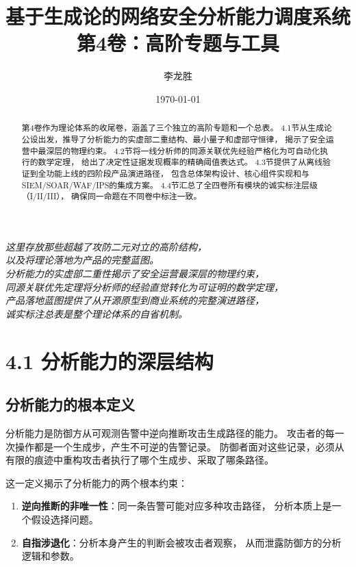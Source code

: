 \documentclass[11pt,a4paper]{article}
\title{基于生成论的网络安全分析能力调度系统\\
第4卷：高阶专题与工具}
\author{李龙胜}
\date{\today}
\begin{document}
\maketitle

\begin{center}
\textit{
这里存放那些超越了攻防二元对立的高阶结构，\\
以及将理论落地为产品的完整蓝图。\\
分析能力的实虚部二重性揭示了安全运营最深层的物理约束，\\
同源关联优先定理将分析师的经验直觉转化为可证明的数学定理，\\
产品落地蓝图提供了从开源原型到商业系统的完整演进路径，\\
诚实标注总表是整个理论体系的自省机制。\\
}
\end{center}

\vspace{5mm}

\begin{abstract}
第4卷作为理论体系的收尾卷，涵盖了三个独立的高阶专题和一个总表。
4.1节从生成论公设出发，推导了分析能力的实虚部二重结构、最小量子和虚部守恒律，
揭示了安全运营中最深层的物理约束。
4.2节将一线分析师的同源关联优先经验严格化为可自动化执行的数学定理，
给出了决定性证据发现概率的精确阈值表达式。
4.3节提供了从离线验证到全功能上线的四阶段产品演进路径，
包含总体架构设计、核心组件实现和与SIEM/SOAR/WAF/IPS的集成方案。
4.4节汇总了全四卷所有模块的诚实标注层级（I/II/III），
确保同一命题在不同卷中标注一致。
\end{abstract}

\tableofcontents

\section{4.1 分析能力的深层结构}

\subsection{分析能力的根本定义}

分析能力是防御方从可观测告警中逆向推断攻击生成路径的能力。
攻击者的每一次操作都是一个生成步，产生不可逆的告警记录。
防御者面对这些记录，必须从有限的痕迹中重构攻击者执行了哪个生成步、采取了哪条路径。

这一定义揭示了分析能力的两个根本约束：
\begin{enumerate}[label=(\arabic*)]
    \item \textbf{逆向推断的非唯一性}：同一条告警可能对应多种攻击路径，
          分析本质上是一个假设选择问题。
    \item \textbf{自指涉退化}：分析本身产生的判断会被攻击者观察，
          从而泄露防御方的分析逻辑和参数。
\end{enumerate}
\end{document}
